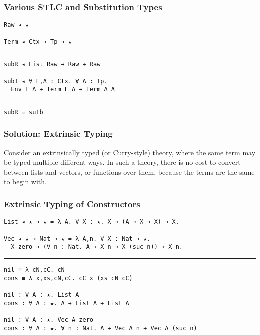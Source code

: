 \documentclass[mathserif,usenames,dvipsnames]{beamer}
\begin{document}
\begin{frame}[fragile]
\frametitle{Various STLC and Substitution Types}

\begin{verbatim}
Raw ◂ ★

Term ◂ Ctx ➔ Tp ➔ ★
\end{verbatim}

\noindent\rule{\textwidth}{1pt}

\begin{verbatim}
subR ◂ List Raw ➔ Raw ➔ Raw

subT ◂ ∀ Γ,Δ : Ctx. ∀ A : Tp.
  Env Γ Δ ➔ Term Γ A ➔ Term Δ A
\end{verbatim}

\noindent\rule{\textwidth}{1pt}

\begin{verbatim}
subR = suTb
\end{verbatim}

\end{frame}

\begin{frame}[fragile]
\frametitle{Solution: Extrinsic Typing}

Consider an extrinsically typed (or Curry-style) theory, where the
same term may be typed multiple different ways. In such a theory,
there is no cost to convert between lists and vectors, or functions
over them, because the terms are the same to begin with.

\end{frame}

\begin{frame}[fragile]
\frametitle{Extrinsic Typing of Constructors}

\begin{verbatim}
List ◂ ★ ➔ ★ = λ A. ∀ X : ★. X ➔ (A ➔ X ➔ X) ➔ X.

Vec ◂ ★ ➔ Nat ➔ ★ = λ A,n. ∀ X : Nat ➔ ★.
  X zero ➔ (∀ n : Nat. A ➔ X n ➔ X (suc n)) ➔ X n.
\end{verbatim}

\noindent\rule{\textwidth}{1pt}

\begin{verbatim}
nil ≡ λ cN,cC. cN
cons ≡ λ x,xs,cN,cC. cC x (xs cN cC)

nil : ∀ A : ★. List A
cons : ∀ A : ★. A ➔ List A ➔ List A

nil : ∀ A : ★. Vec A zero
cons : ∀ A : ★. ∀ n : Nat. A ➔ Vec A n ➔ Vec A (suc n)
\end{verbatim}

\end{frame}
\end{document}

